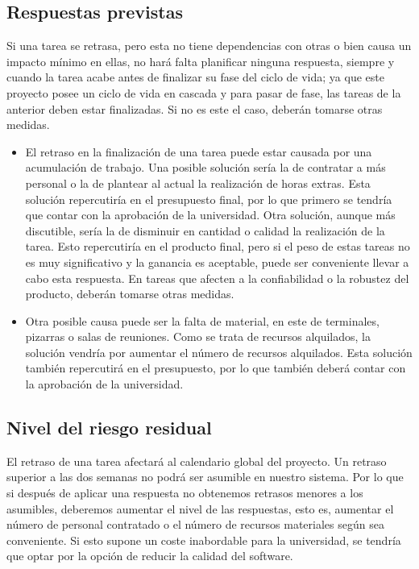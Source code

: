 \documentclass[11pt,a4paper,spanish,twoside]{report}
\begin{document}
\subsection{Respuestas previstas}
Si una tarea se retrasa, pero esta no tiene dependencias con otras o bien
causa un impacto mínimo en ellas, no hará falta planificar ninguna respuesta,
siempre y cuando la tarea acabe antes de finalizar su fase del ciclo de vida;
ya que este proyecto posee un ciclo de vida en cascada y para pasar de fase,
las tareas de la anterior deben estar finalizadas. Si no es este el caso,
deberán tomarse otras medidas.
\begin{itemize}
\item El retraso en la finalización de una tarea puede estar causada por una
acumulación de trabajo. Una posible solución sería la de contratar a más
personal o la de plantear al actual la realización de horas extras. Esta
solución repercutiría en el presupuesto final, por lo que primero se tendría
que contar con la aprobación de la universidad.
Otra solución, aunque más discutible, sería la de disminuir en cantidad o
calidad la realización de la tarea. Esto repercutiría en el producto final,
pero si el peso de estas tareas no es muy significativo y la ganancia es
aceptable, puede ser conveniente llevar a cabo esta respuesta. En tareas que
afecten a la confiabilidad o la robustez del producto, deberán tomarse otras
medidas.
\item Otra posible causa puede ser la falta de material, en este de
terminales, pizarras o salas de reuniones. Como se trata de recursos
alquilados, la solución vendría por aumentar el número de recursos alquilados.
Esta solución también repercutirá en el presupuesto, por lo que también
deberá contar con la aprobación de la universidad.
\end{itemize}

\subsection{Nivel del riesgo residual}
El retraso de una tarea afectará al calendario global del proyecto. Un retraso
superior a las dos semanas no podrá ser asumible en nuestro sistema. Por lo
que si después de aplicar una respuesta no obtenemos retrasos menores a los
asumibles, deberemos aumentar el nivel de las respuestas, esto es, aumentar
el número de personal contratado o el número de recursos materiales según sea
conveniente. Si esto supone un coste inabordable para la universidad, se
tendría que optar por la opción de reducir la calidad del software.
\end{document}
